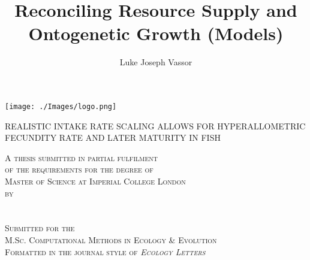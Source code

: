 \documentclass[a4paper]{article} %
\title{Reconciling Resource Supply and Ontogenetic Growth (Models)}
\author{Luke Joseph Vassor}
\begin{document}
\begin{titlepage}
    
    \texttt{[image: ./Images/logo.png]}\\%
     
    
    \center %
    
    
    \makeatletter
    \linespread{1.5} %
        {\huge{REALISTIC INTAKE RATE SCALING ALLOWS FOR HYPERALLOMETRIC FECUNDITY RATE AND LATER MATURITY IN FISH}\par} %
    \vspace{2.5cm} %

    \textsc{A thesis submitted in partial fulfilment \\ of the requirements for the degree of \\ Master of Science at Imperial College London \\ by \\ \ }\\[2.5cm]
    \textsc{\Large \@author}\\[2.5cm]
    \textsc{Submitted for the \\ M.Sc. Computational Methods in Ecology \& Evolution \\ Formatted in the journal style of \textsl{\textsc{Ecology Letters}} \\ \ }\\[2cm]


\end{titlepage}
\end{document}
